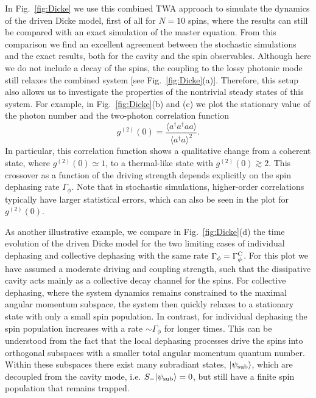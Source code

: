 \documentclass[pra,twocolumn,showpacs,preprintnumbers,amsmath,amssymb,superscriptaddress]{revtex4-1}
\newcommand{\erw}[1]{\langle#1\rangle}
\begin{document}
In Fig.~\ref{fig:Dicke} we use this combined TWA approach to simulate the dynamics of the driven Dicke model, first of all for $N=10$ spins, where the results can still be compared with an exact simulation of the master equation. From this comparison we find an excellent agreement between the stochastic simulations and the exact results, both for the cavity and the spin observables. Although here we do not include a decay of the spins, the coupling to the lossy photonic mode still relaxes  the combined system [see Fig.~\ref{fig:Dicke}(a)]. Therefore, this setup also allows us to investigate the properties of the nontrivial steady states of this system. For example, in Fig.~\ref{fig:Dicke}(b) and (c) we plot the stationary value of the photon number and the two-photon correlation function 
\begin{equation}
g^{(2)}(0)=\frac{\erw{a^\dagger a^\dagger a a}}{\erw{a^\dagger a}^2}.
\end{equation}
In particular, this correlation function shows a qualitative change from a coherent state, where $g^{(2)}(0)\simeq 1$, to a thermal-like state with $g^{(2)}(0)\gtrsim 2$. This crossover as a function of the driving strength depends explicitly on the spin dephasing rate $\Gamma_\phi$. Note that in stochastic simulations, higher-order correlations typically have larger statistical errors, which can also be seen in the plot for $g^{(2)}(0)$.


As another illustrative example, we compare in Fig.~\ref{fig:Dicke}(d) the time evolution of the driven Dicke model for the two limiting cases of individual dephasing and collective dephasing with the same rate $\Gamma_\phi=\Gamma_\phi^{\rm C}$. For this plot we have assumed a moderate driving and coupling strength, such that the dissipative cavity acts mainly as a collective decay channel for the spins. For collective dephasing, where the system dynamics remains constrained to the maximal angular momentum subspace, the system then quickly relaxes to a stationary state with only a small spin population. In contrast, for individual dephasing the spin population increases with a rate $\sim \Gamma_\phi$ for longer times. This can be understood from the fact that the local dephasing processes drive the spins into orthogonal subspaces with a smaller total angular momentum quantum number. Within these subspaces there exist many  subradiant states, $|\psi_{\rm sub}\rangle$, which are decoupled from the cavity mode, i.e. $S_-|\psi_{\rm sub}\rangle=0$, but still have a finite spin population that remains trapped.
\end{document}
